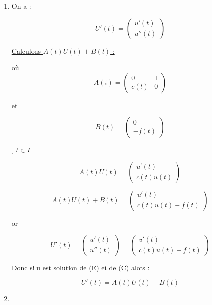 \documentclass[12pt, letterpaper]{article}
\begin{document}
\begin{enumerate}

\item On a :

  \begin{equation*}
    U'(t) = \left(
    \begin{array}{l}
      u'(t) \\
      u''(t)
    \end{array}
    \right)
  \end{equation*}

  \underline{Calculons $A(t)U(t)+B(t)$ :}

  où \begin{equation*}
    A(t) = \left(
    \begin{array}{ll}
      0 & 1\\
      c(t) & 0
    \end{array}
    \right)
  \end{equation*}

  et
  
  \begin{equation*}
    B(t) = \left(
    \begin{array}{l}
      0 \\
      -f(t)
    \end{array}
    \right)
  \end{equation*}

  , $t \in I$.

  \begin{equation*}
    A(t)U(t) = \left(
    \begin{array}{l}
      u'(t) \\
      c(t)u(t)
    \end{array}
    \right)
  \end{equation*}

  \begin{equation*}
    A(t)U(t) + B(t) = \left(
    \begin{array}{l}
      u'(t) \\
      c(t)u(t) - f(t)
    \end{array}
    \right)
  \end{equation*}

  or

  \begin{equation*}
    U'(t) = \left(
    \begin{array}{l}
      u'(t) \\
      u''(t)
    \end{array}
    \right)
    =
    \left(
    \begin{array}{l}
      u'(t) \\
      c(t)u(t) - f(t)
    \end{array}
    \right)
  \end{equation*}

  Donc si u est solution de (E) et de (C) alors :

  \begin{equation*}
    U'(t) = A(t)U(t) + B(t)
  \end{equation*}

\item 
  
\end{enumerate}
\end{document}
